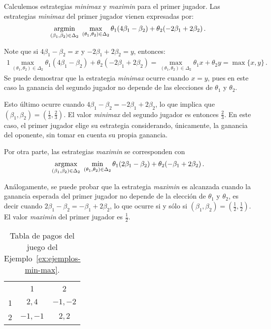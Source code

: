 Calculemos estrategias \textit{minimax} y \textit{maximin} para el primer jugador. Las estrategias \textit{minimax} del primer jugador vienen expresadas por:
\begin{alignat}{1}
\operatorname*{\arg\!\min}_{(\beta_1, \beta_2) \in \Delta_2 }\ {\max_{(\theta_1, \theta_2) \in \Delta_2}
{\theta_1(4\beta_1 -\beta_2) + \theta_2(-2\beta_1 + 2\beta_2)}} \,.
\end{alignat}

Note que si $4\beta_1 - \beta_2 = x$ y $-2 \beta_1 + 2\beta_2 = y$, entonces:
\begin{alignat}{1}
\max_{(\theta_1, \theta_2) \in \Delta_2} \theta_1(4\beta_1 -\beta_2) + \theta_2(-2\beta_1 + 2\beta_2) = \max_{(\theta_1, \theta_2) \in \Delta_2} \theta_1 x + \theta_2 y = \max\{x, y\} \,.
\end{alignat}
Se puede demostrar que la estrategia \textit{minimax} ocurre cuando $x = y$, pues en este caso la ganancia del segundo jugador no depende de las elecciones de $\theta_1$ y $\theta_2$.

Esto último ocurre cuando $4\beta_1 - \beta_2 = -2\beta_1 + 2\beta_2$, lo que implica que $(\beta_1, \beta_2) = \left(\frac{1}{3}, \frac{2}{3} \right)$.  El valor \textit{minimax} del segundo jugador es entonces $\frac{2}{3}$. En este caso, el primer jugador elige su estrategia considerando, únicamente, la ganancia del oponente, sin tomar en cuenta su propia ganancia.

Por otra parte, las estrategias \textit{maximin} se corresponden con
\begin{alignat}{1}
\operatorname*{\arg\!\max}_{(\beta_1, \beta_2) \in \Delta_2 }\ {\min_{(\theta_1, \theta_2) \in \Delta_2}
{\theta_1(2\beta_1 -\beta_2) + \theta_2(-\beta_1 + 2\beta_2)}} \,.
\end{alignat}

Análogamente, se puede probar que la estrategia \textit{maximin} es alcanzada cuando la ganancia esperada del primer jugador no depende de la elección de $\theta_1$ y $\theta_2$, es decir cuando $2\beta_1 - \beta_2 = -\beta_1 + 2\beta_2$, lo que ocurre si y sólo si $(\beta_1, \beta_2) = \left(\frac{1}{2}, \frac{1}{2}\right)$. El valor \textit{maximin} del primer jugador es $\frac{1}{2}$.

\begin{table}[t]
\begin{center}
\caption{Tabla de pagos del juego del Ejemplo~\ref{ex:ejemplos-min-max}.}
\label{table:ejemplos-min-max}
\begin{tabular}{ r | c | c |}
 \multicolumn{1}{c}{} & \multicolumn{1}{c}{1} & \multicolumn{1}{c}{2}  \\ \cline{2-3}
 1 & $2, 4$ & $-1, -2$ \\ \cline{2-3}
 2 & $-1, -1$ & $2, 2$ \\ \cline{2-3}
\end{tabular}
\end{center}
\end{table}

